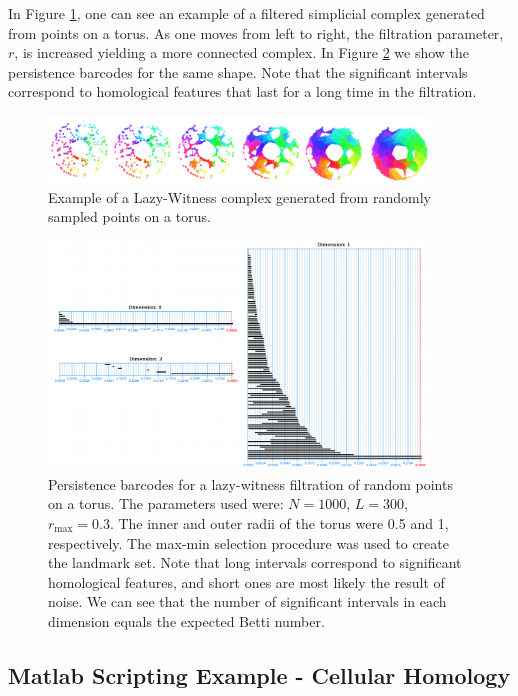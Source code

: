 \documentclass[runningheads,a4paper]{llncs}
\begin{document}
In Figure \ref{lwtorus}, one can see an example of a filtered simplicial complex generated from points on a torus. As one moves from left to right, the filtration parameter, $r$, is increased yielding a more connected complex. In Figure \ref{lwtorusbarcodes} we show the persistence barcodes for the same shape. Note that the significant intervals correspond to homological features that last for a long time in the filtration.

\begin{figure}
\centering
\includegraphics[width=0.9\textwidth]{images/tori_small.png}
\caption{Example of a Lazy-Witness complex generated from randomly sampled points on a torus.} \label{lwtorus}
\end{figure}

\begin{figure}
\centering
\includegraphics[width=0.9\textwidth]{images/barcodes_small.png}
\caption{Persistence barcodes for a lazy-witness filtration of random points on a torus. The parameters used were: $N = 1000$, $L = 300$, $r_{\max} = 0.3$. The inner and outer radii of the torus were 0.5 and 1, respectively. The max-min selection procedure was used to create the landmark set. Note that long intervals correspond to significant homological features, and short ones are most likely the result of noise. We can see that the number of significant intervals in each dimension equals the expected Betti number.} \label{lwtorusbarcodes}
\end{figure}

\subsection{Matlab Scripting Example - Cellular Homology}
\end{document}
